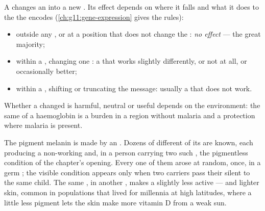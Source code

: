 \begin{proposition}\label{prop:g11:mutations:consequences}
A  changes an  into a new . Its effect depends on
where it falls and what it does to the  the  encodes
(\cref{ch:g11:gene-expression} gives the rules):
\begin{itemize}
  \item outside any , or at a position that does not change the
        : \emph{no effect} --- the great majority;
  \item within a , changing one : a  that works
        slightly differently, or not at all, or occasionally better;
  \item within a , shifting or truncating the message: usually a
         that does not work.
\end{itemize}
Whether a changed  is harmful, neutral or useful depends on the
environment: the same  of a haemoglobin  is a burden in a
region without malaria and a protection where malaria is present.
\end{proposition}
\admitted

\begin{example}\label{ex:g11:mutations:pigment}
The pigment melanin is made by an . Dozens of different
 of its  are known, each producing a non-working 
and, in a person carrying two such , the pigmentless
condition of the chapter's opening. Every one of them arose at random,
once, in a germ ; the visible condition appears only when two
carriers pass their silent  to the same child. The same ,
in another , makes a slightly less active  --- and lighter
skin, common in populations that lived for millennia at high
latitudes, where a little less pigment lets the skin make more vitamin
D from a weak sun.
\end{example}

